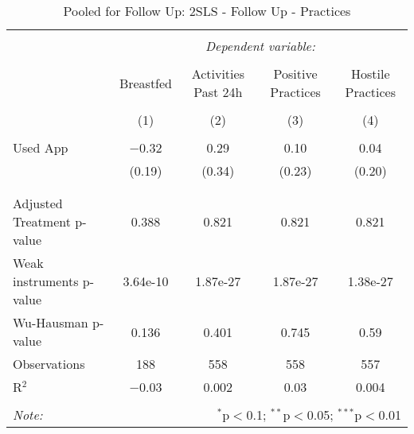 
\begin{table}[!htbp] \centering 
  \caption{Pooled for Follow Up: 2SLS - Follow Up - Practices} 
  \label{tbl:Pooled for Follow Up: 2SLS - Follow Up - Practices} 
\begin{tabular}{@{\extracolsep{5pt}}lcccc} 
\\[-1.8ex]\hline 
\hline \\[-1.8ex] 
 & \multicolumn{4}{c}{\textit{Dependent variable:}} \\ 
\cline{2-5} 
\\[-1.8ex] & Breastfed & Activities Past 24h & Positive Practices & Hostile Practices \\ 
\\[-1.8ex] & (1) & (2) & (3) & (4)\\ 
\hline \\[-1.8ex] 
 Used App & $-$0.32 & 0.29 & 0.10 & 0.04 \\ 
  & (0.19) & (0.34) & (0.23) & (0.20) \\ 
  & & & & \\ 
\hline \\[-1.8ex] 
Adjusted Treatment p-value & 0.388 & 0.821 & 0.821 & 0.821 \\ 
Weak instruments p-value & 3.64e-10 & 1.87e-27 & 1.87e-27 & 1.38e-27 \\ 
Wu-Hausman p-value & 0.136 & 0.401 & 0.745 & 0.59 \\ 
Observations & 188 & 558 & 558 & 557 \\ 
R$^{2}$ & $-$0.03 & 0.002 & 0.03 & 0.004 \\ 
\hline 
\hline \\[-1.8ex] 
\textit{Note:}  & \multicolumn{4}{r}{$^{*}$p$<$0.1; $^{**}$p$<$0.05; $^{***}$p$<$0.01} \\ 
\end{tabular} 
\end{table} 

